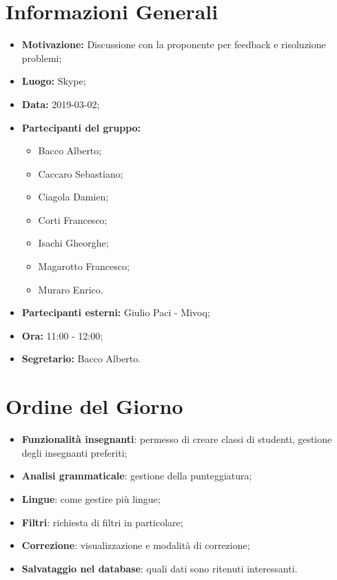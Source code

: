 \documentclass[a4paper, oneside, openany, dvipsnames, table]{article}
\begin{document}
\copertina{}


\newpage
\tableofcontents
\newpage
\section{Informazioni Generali}
\begin{itemize}
\item \textbf{Motivazione:} Discussione con la proponente per feedback e risoluzione problemi;
\item \textbf{Luogo:} Skype;
\item \textbf{Data:} 2019-03-02;
\item \textbf{Partecipanti del gruppo:} \hfill
	\begin{itemize}
	\item Bacco Alberto;
	\item Caccaro Sebastiano;
	\item Ciagola Damien;
	\item Corti Francesco;
	\item Isachi Gheorghe;
	\item Magarotto Francesco;
	\item Muraro Enrico.
	\end{itemize} 
\item \textbf{Partecipanti esterni:} Giulio Paci - Mivoq;
\item \textbf{Ora:} 11:00 - 12:00;
\item \textbf{Segretario:} Bacco Alberto.
\end{itemize}

\section{Ordine del Giorno}
\begin{itemize}
	\item \textbf{Funzionalità insegnanti}: permesso di creare classi di studenti, gestione degli insegnanti preferiti;
	\item \textbf{Analisi grammaticale}: gestione della punteggiatura;
	\item \textbf{Lingue}: come gestire più lingue;
	\item \textbf{Filtri}: richiesta di filtri in particolare;
	\item \textbf{Correzione}: visualizzazione e modalità di correzione;
	\item \textbf{Salvataggio nel database}: quali dati sono ritenuti interessanti.
\end{itemize}
\end{document}
